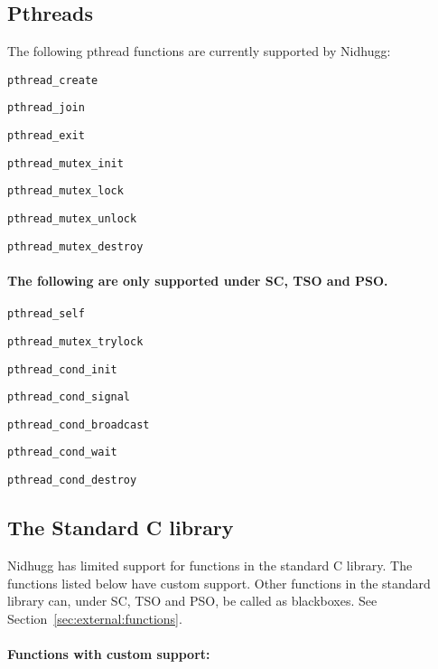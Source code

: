 \documentclass[a4paper]{article}
\begin{document}
\subsection{Pthreads}

The following pthread functions are currently supported by Nidhugg:

\begin{description}
\item{\texttt{pthread\_create}}
\item{\texttt{pthread\_join}}
\item{\texttt{pthread\_exit}}
\item{\texttt{pthread\_mutex\_init}}
\item{\texttt{pthread\_mutex\_lock}}
\item{\texttt{pthread\_mutex\_unlock}}
\item{\texttt{pthread\_mutex\_destroy}}
\end{description}

\paragraph{The following are only supported under SC, TSO and PSO.}

\begin{description}
\item{\texttt{pthread\_self}}
\item{\texttt{pthread\_mutex\_trylock}}
\item{\texttt{pthread\_cond\_init}}
\item{\texttt{pthread\_cond\_signal}}
\item{\texttt{pthread\_cond\_broadcast}}
\item{\texttt{pthread\_cond\_wait}}
\item{\texttt{pthread\_cond\_destroy}}
\end{description}

\subsection{The Standard C library}\label{sec:stdlibc}

Nidhugg has limited support for functions in the standard C
library. The functions listed below have custom support. Other
functions in the standard library can, under SC, TSO and PSO, be
called as blackboxes. See Section~\ref{sec:external:functions}.

\paragraph{Functions with custom support:}
\end{document}
